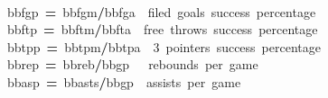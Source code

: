 \documentclass[english]{article}
\newenvironment{dummy}{\par}{\par}
\newcommand{\hlkeyword}[1]{\textcolor[rgb]{0,0,0}{\textbf{#1}}}%
\newcommand{\hlcomment}[1]{\textcolor[rgb]{0.8,0.8,0.8}{#1}}%
\newcommand{\hlassignement}[1]{\textcolor[rgb]{0.215686274509804,0.215686274509804,0.384313725490196}{\textbf{#1}}}%
\newcommand{\hlsymbol}[1]{\textcolor[rgb]{0,0,0}{#1}}%
\newcommand{\hlprompt}[1]{\textcolor[rgb]{0,0,0}{#1}}%
\newcommand{\hlstd}[1]{\textcolor[rgb]{0,0,0}{#1}}%
\begin{document}
\begin{dummy}
\hspace*{\fill}\\
\hlstd{}\ttfamily\noindent
\hlprompt{\usebox{\hlnormalsizeboxgreaterthan}{\ }}\hlsymbol{bb}\hlkeyword{\usebox{\hlnormalsizeboxdollar}}\hlsymbol{fgp}{\ }\hlassignement{=}{\ }\hlsymbol{bb}\hlkeyword{\usebox{\hlnormalsizeboxdollar}}\hlsymbol{fgm}\hlkeyword{/}\hlsymbol{bb}\hlkeyword{\usebox{\hlnormalsizeboxdollar}}\hlsymbol{fga}{\ }{\ }\hlcomment{\usebox{\hlnormalsizeboxhash}{\ }filed{\ }goals{\ }success{\ }percentage}\mbox{}
\normalfont
\hspace*{\fill}\\
\hlstd{}\ttfamily\noindent
\hlprompt{\usebox{\hlnormalsizeboxgreaterthan}{\ }}\hlsymbol{bb}\hlkeyword{\usebox{\hlnormalsizeboxdollar}}\hlsymbol{ftp}{\ }\hlassignement{=}{\ }\hlsymbol{bb}\hlkeyword{\usebox{\hlnormalsizeboxdollar}}\hlsymbol{ftm}\hlkeyword{/}\hlsymbol{bb}\hlkeyword{\usebox{\hlnormalsizeboxdollar}}\hlsymbol{fta}{\ }{\ }\hlcomment{\usebox{\hlnormalsizeboxhash}{\ }free{\ }throws{\ }success{\ }percentage}\mbox{}
\normalfont
\hspace*{\fill}\\
\hlstd{}\ttfamily\noindent
\hlprompt{\usebox{\hlnormalsizeboxgreaterthan}{\ }}\hlsymbol{bb}\hlkeyword{\usebox{\hlnormalsizeboxdollar}}\hlsymbol{tpp}{\ }\hlassignement{=}{\ }\hlsymbol{bb}\hlkeyword{\usebox{\hlnormalsizeboxdollar}}\hlsymbol{tpm}\hlkeyword{/}\hlsymbol{bb}\hlkeyword{\usebox{\hlnormalsizeboxdollar}}\hlsymbol{tpa}{\ }{\ }\hlcomment{\usebox{\hlnormalsizeboxhash}{\ }3{\ }pointers{\ }success{\ }percentage}\mbox{}
\normalfont
\hspace*{\fill}\\
\hlstd{}\ttfamily\noindent
\hlprompt{\usebox{\hlnormalsizeboxgreaterthan}{\ }}\hlsymbol{bb}\hlkeyword{\usebox{\hlnormalsizeboxdollar}}\hlsymbol{rep}{\ }\hlassignement{=}{\ }\hlsymbol{bb}\hlkeyword{\usebox{\hlnormalsizeboxdollar}}\hlsymbol{reb}\hlkeyword{/}\hlsymbol{bb}\hlkeyword{\usebox{\hlnormalsizeboxdollar}}\hlsymbol{gp}{\ }{\ }{\ }\hlcomment{\usebox{\hlnormalsizeboxhash}{\ }rebounds{\ }per{\ }game}\mbox{}
\normalfont
\hspace*{\fill}\\
\hlstd{}\ttfamily\noindent
\hlprompt{\usebox{\hlnormalsizeboxgreaterthan}{\ }}\hlsymbol{bb}\hlkeyword{\usebox{\hlnormalsizeboxdollar}}\hlsymbol{asp}{\ }\hlassignement{=}{\ }\hlsymbol{bb}\hlkeyword{\usebox{\hlnormalsizeboxdollar}}\hlsymbol{asts}\hlkeyword{/}\hlsymbol{bb}\hlkeyword{\usebox{\hlnormalsizeboxdollar}}\hlsymbol{gp}{\ }{\ }\hlcomment{\usebox{\hlnormalsizeboxhash}{\ }assists{\ }per{\ }game}\mbox{}

\end{dummy}
\end{document}
